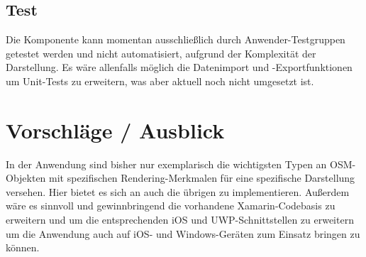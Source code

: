 \subsection{Test}
Die Komponente kann momentan ausschließlich durch Anwender-Testgruppen getestet werden und nicht automatisiert, aufgrund der Komplexität der Darstellung. Es wäre allenfalls möglich die Datenimport und -Exportfunktionen um Unit-Tests zu erweitern, was aber aktuell noch nicht umgesetzt ist. 

\section{Vorschläge / Ausblick}
In der Anwendung sind bisher nur exemplarisch die wichtigsten Typen an OSM-Objekten mit spezifischen Rendering-Merkmalen für eine spezifische Darstellung versehen. Hier bietet es sich an auch die übrigen zu implementieren. Außerdem wäre es sinnvoll und gewinnbringend die vorhandene Xamarin-Codebasis zu erweitern und um die entsprechenden iOS und UWP-Schnittstellen zu erweitern um die Anwendung auch auf iOS- und Windows-Geräten zum Einsatz bringen zu können.